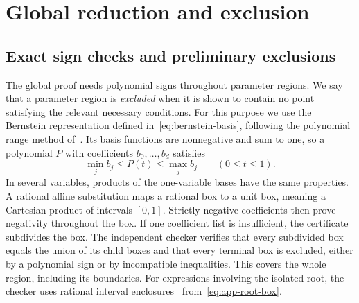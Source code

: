 \documentclass[11pt]{article}
\theoremstyle{remark}
\theoremstyle{plain}
\begin{document}
\section{Global reduction and exclusion}
\label{app:global}

\subsection{Exact sign checks and preliminary exclusions}
\label{app:preliminary}

The global proof needs polynomial signs throughout parameter regions.
We say that a parameter region is \emph{excluded} when it is shown to
contain no point satisfying the relevant necessary conditions.
For this purpose we use the Bernstein representation defined
in~\eqref{eq:bernstein-basis}, following the polynomial range
method of~\cite{garloff1986}. Its basis functions are nonnegative
and sum to one, so a polynomial $P$ with coefficients $b_0,\ldots,b_d$
satisfies
\begin{equation}
 \min_jb_j\le P(t)\le\max_jb_j\qquad(0\le t\le1).
 \label{eq:bernstein-sign-bound}
\end{equation}
In several variables, products of the one-variable bases have the
same properties. A rational affine substitution maps a rational box
to a unit box, meaning a Cartesian product of intervals $[0,1]$.
Strictly negative coefficients then prove negativity throughout
the box. If one coefficient list is insufficient, the certificate
subdivides the box. The independent checker verifies that every
subdivided box equals the union of its child boxes and that every
terminal box is excluded, either by a polynomial sign or by
incompatible inequalities. This covers the whole region, including its boundaries.
For expressions involving the isolated root, the checker uses rational
interval enclosures~\cite{moore2009} from~\eqref{eq:app-root-box}.
\end{document}
